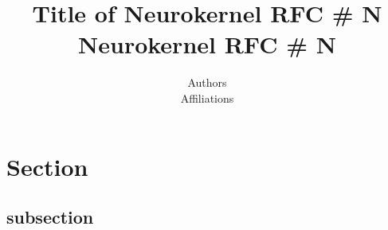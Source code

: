 \documentclass[12pt]{article}
\title{Title of Neurokernel RFC \# N\\
{\large Neurokernel RFC \# N}
}
\author{Authors\\
Affiliations
}
\begin{document}
\maketitle

\begin{abstract}

\end{abstract}

\newpage
\tableofcontents
\newpage

\section{Section}
\subsection{subsection}

\newpage


\end{document}
